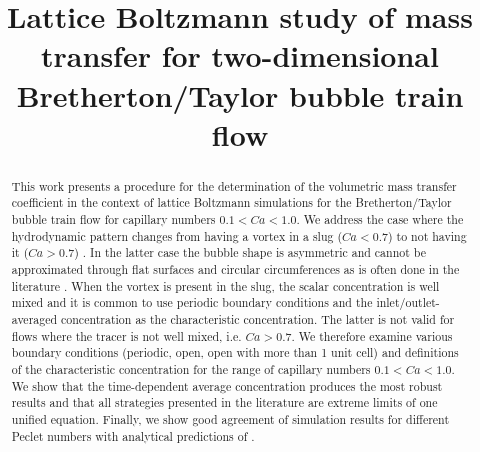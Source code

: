 \documentclass{article}
\title{Lattice Boltzmann study of mass transfer for two-dimensional Bretherton/Taylor bubble train flow}
\begin{document}
\maketitle
\begin{abstract}
This work presents a procedure for the determination of the volumetric mass transfer
coefficient in the context of lattice Boltzmann simulations for the Bretherton/Taylor bubble train
flow for capillary numbers $0.1 < Ca < 1.0$. We address the case where the hydrodynamic pattern changes from having a
vortex in a slug ($Ca<0.7$) to not having it ($Ca>0.7$) \cite{giavedoni-numerical}.  In the latter case
the bubble shape is asymmetric and cannot be approximated through flat surfaces and circular circumferences as
is often done in the literature \cite{vanbaten-circular,kreutzer-overview}.  When the vortex is present
in the slug, the scalar concentration is well mixed and it is common to use periodic boundary conditions and the inlet/outlet-averaged concentration
as the characteristic concentration. %
The latter is not valid for flows where the tracer is not well mixed, i.e. $Ca>0.7$.  We therefore
examine various boundary conditions (periodic, open, open with more than 1 unit cell) and definitions of the characteristic concentration for the range of capillary numbers $0.1<Ca<1.0$.
We show that the time-dependent average concentration produces the most robust results and
that all strategies presented in the literature are extreme limits of one unified equation. %
Finally, we show good agreement of simulation results for different Peclet numbers
with analytical predictions of \citet{vanbaten-circular}. %
\end{abstract}
\end{document}
